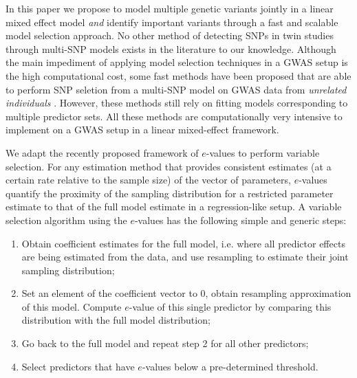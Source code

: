 
In this paper we propose to model multiple genetic variants jointly in a linear mixed effect model {\it and} identify important variants through a fast and scalable model selection approach. No other method of detecting SNPs in twin studies through multi-SNP models exists in the literature to our knowledge. Although the main impediment of applying model selection techniques in a GWAS setup is the high computational cost, some fast methods have been proposed that are able to perform SNP seletion from a multi-SNP model on GWAS data from \textit{unrelated individuals} \citep{ZhangEtal14,FrommeletEtal12}. However, these methods still rely on fitting models corresponding to multiple predictor sets. All these methods are computationally very intensive to implement on a GWAS setup in a linear mixed-effect framework.

We adapt the recently proposed framework of $e$-values \citep{MajumdarChatterjee17} to perform variable selection. For any estimation method that provides consistent estimates (at a certain rate relative to the sample size) of the vector of parameters, $e$-values quantify the proximity of the sampling distribution for a restricted parameter estimate to that of the full model estimate in a regression-like setup. A variable selection algorithm using the $e$-values has the following simple and generic steps:
%
\begin{enumerate}
\item Obtain coefficient estimates for the full model, i.e. where all predictor effects are being estimated from the data, and use resampling to estimate their joint sampling distribution;

\item Set an element of the coefficient vector to 0, obtain resampling approximation of this model. Compute $e$-value of this single predictor by comparing this distribution with the full model distribution;

\item Go back to the full model and repeat step 2 for all other predictors;

\item Select predictors that have $e$-values below a pre-determined threshold.
\end{enumerate}

